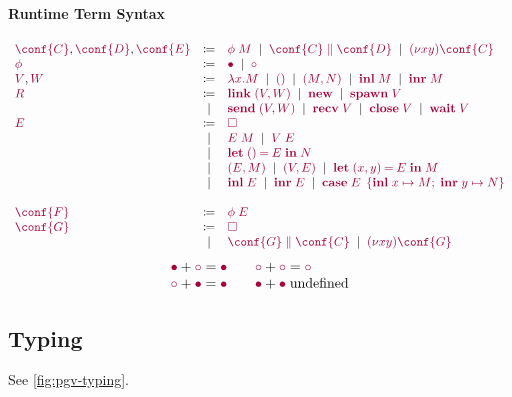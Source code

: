 \documentclass[main.tex]{subfiles}
\begin{document}
\paragraph*{Runtime Term Syntax}
\[
\begin{array}[t]{lcl}
  \tm{\conf{C}}, \tm{\conf{D}}, \tm{\conf{E}}
  & \coloneqq & \tm{\phi\;M}
    \sep        \tm{\ppar{\conf{C}}{\conf{D}}}
    \sep        \tm{\res{x}{y}{\conf{C}}}
  \\
  \tm{\phi}
  & \coloneqq & \tm{\main}
    \sep        \tm{\child}
  \\
  \tm{V}, \tm{W}
  & \coloneqq & \tm{\lambda x.M}
    \sep        \tm{\unit}
    \sep        \tm{\pair{M}{N}}
    \sep        \tm{\inl{M}}
    \sep        \tm{\inr{M}}
  \\
  \tm{R}
  & \coloneqq & \tm{\link\;\pair{V}{W}}
    \sep        \tm{\new}
    \sep        \tm{\spawn\;V} \\
  & \sep      & \tm{\send\;\pair{V}{W}}
    \sep        \tm{\recv\;V}
    \sep        \tm{\close\;V}
    \sep        \tm{\wait\;V}
  \\
  \tm{E}
  & \coloneqq & \tm{\hole} \\
  & \sep      & \tm{E\;M}
    \sep        \tm{V\;E} \\
  & \sep      & \tm{\letunit{E}{N}} \\
  & \sep      & \tm{\pair{E}{M}}
    \sep        \tm{\pair{V}{E}}
    \sep        \tm{\letpair{x}{y}{E}{M}} \\
  & \sep      & \tm{\inl{E}}
    \sep        \tm{\inr{E}}
    \sep        \tm{\casesum{E}{x}{M}{y}{N}} \\
  \\
  \tm{\conf{F}}
  & \coloneqq & \tm{\phi\;E}
  \\
  \tm{\conf{G}}
  & \coloneqq & \tm{\hole} \\
  & \sep      & \tm{\ppar{\conf{G}}{\conf{C}}}
    \sep        \tm{\res{x}{y}{\conf{G}}}
\end{array}
\]
\[
\begin{array}{ll}
  \tm{\main}  + \tm{\child} = \tm{\main}
  \\
  \tm{\child} + \tm{\main}  = \tm{\main}
\end{array}
\quad
\begin{array}{ll}
  \tm{\child} + \tm{\child} = \tm{\child}
  \\
  \tm{\main}  + \tm{\main} \; \text{undefined}
\end{array}
\]

\subsection{Typing}

See \cref{fig:pgv-typing}.
\end{document}
